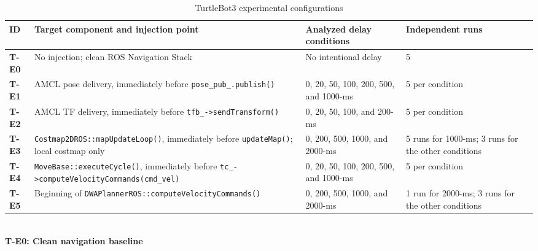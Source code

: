 \begin{table}[t]
\centering
\caption{TurtleBot3 experimental configurations}
\label{tab:turtlebot3_configs}
\renewcommand{\arraystretch}{1.5} 
\begin{tabular}{
    p{}
    p{}
    p{}
    p{}
}
\hline
\textbf{ID} &
\textbf{Target component and injection point} &
\textbf{Analyzed delay conditions} &
\textbf{Independent runs} \\
\hline

\textbf{T-E0} &
\raggedright No injection; clean ROS Navigation Stack &
No intentional delay &
5 \\

\textbf{T-E1} &
\raggedright AMCL pose delivery, immediately before \newline
\texttt{pose\_pub\_.publish()} &
0, 20, 50, 100, 200, 500, and 1000-ms &
5 per condition \\

\textbf{T-E2} &
\raggedright AMCL TF delivery, immediately before \newline
\texttt{tfb\_->sendTransform()} &
0, 20, 50, 100, and 200-ms &
5 per condition \\

\textbf{T-E3} &
\raggedright \texttt{Costmap2DROS::mapUpdateLoop()}, \newline immediately before
\texttt{updateMap()}; local costmap only &
0, 200, 500, 1000, and 2000-ms &
5 runs for 1000-ms; 3 runs for the other conditions \\

\textbf{T-E4} &
\raggedright \texttt{MoveBase::executeCycle()}, immediately before \newline
\texttt{tc\_->computeVelocityCommands(cmd\_vel)} &
0, 20, 50, 100, 200, 500, and 1000-ms &
5 per condition \\

\textbf{T-E5} &
\raggedright Beginning of \texttt{DWAPlannerROS::}\newline\texttt{computeVelocityCommands()} &
0, 200, 500, 1000, and 2000-ms &
1 run for 2000-ms; 3 runs for the other conditions \\

\hline
\end{tabular}
\end{table}
\\
\noindent \textbf{T-E0: Clean navigation baseline}
\\
